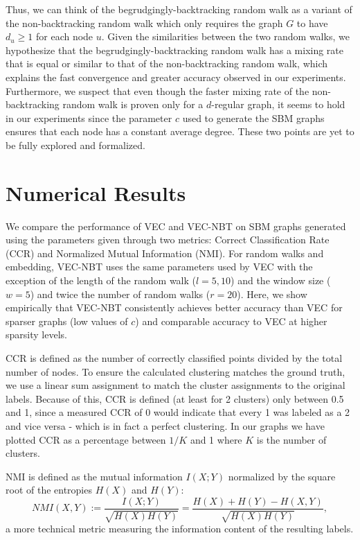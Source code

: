 \documentclass{article} %
\begin{document}
Thus, we can think of the begrudgingly-backtracking random walk as a variant of the non-backtracking random walk which only requires the graph $G$ to have $d_u \geq 1$ for each node $u$. Given the similarities between the two random walks, we hypothesize that the begrudgingly-backtracking random walk has a mixing rate that is equal or similar to that of the non-backtracking random walk, which explains the fast convergence and greater accuracy observed in our experiments. Furthermore, we suspect that even though the faster mixing rate of the non-backtracking random walk is proven only for a $d$-regular graph, it seems to hold in our experiments since the parameter $c$ used to generate the SBM graphs ensures that each node has a constant average degree. These two points are yet to be fully explored and formalized. 

\section{Numerical Results}

We compare the performance of VEC and VEC-NBT on SBM graphs generated using the parameters given through two metrics: Correct Classification Rate (CCR) and Normalized Mutual Information (NMI). For random walks and embedding, VEC-NBT uses the same parameters used by VEC with the exception of the length of the random walk ($l=5, 10$) and the window size ($w=5$) and twice the number of random walks ($r=20$). Here, we show empirically that VEC-NBT consistently achieves better accuracy than VEC for sparser graphs (low values of $c$) and comparable accuracy to VEC at higher sparsity levels.

CCR is defined as the number of correctly classified points divided by the total number of nodes. To ensure the calculated clustering matches the ground truth, we use a linear sum assignment to match the cluster assignments to the original labels. Because of this, CCR is defined (at least for 2 clusters) only between 0.5 and 1, since a measured CCR of 0 would indicate that every 1 was labeled as a 2 and vice versa - which is in fact a perfect clustering. In our graphs we have plotted CCR as a percentage between $1/K$ and 1 where $K$ is the number of clusters.

NMI is defined as the mutual information $I(X;Y)$ normalized by the square root of the entropies $H(X)$ and $H(Y)$:
$$NMI(X,Y) := \frac{I(X;Y)}{\sqrt{H(X)H(Y)}} = \frac{H(X)+H(Y)-H(X,Y)}{\sqrt{H(X)H(Y)}},$$
a more technical metric measuring the information content of the resulting labels.
\end{document}
